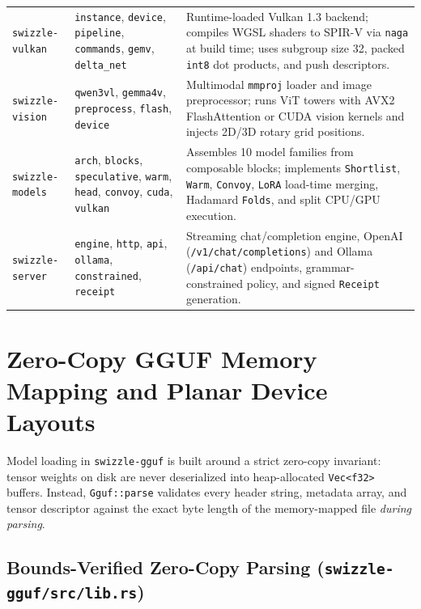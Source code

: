 \documentclass[10pt,a4paper]{article}
\theoremstyle{swzstyle}
\newcommand{\code}[1]{\texttt{#1}}
\begin{document}
\begin{table}[htbp]
\begin{tabularx}{\textwidth}{@{}llX@{}}
    \code{swizzle-vulkan} & \code{instance}, \code{device}, \code{pipeline}, \code{commands}, \code{gemv}, \code{delta\_net} & Runtime-loaded Vulkan 1.3 backend; compiles WGSL shaders to SPIR-V via \code{naga} at build time; uses subgroup size 32, packed \code{int8} dot products, and push descriptors. \\
    \code{swizzle-vision} & \code{qwen3vl}, \code{gemma4v}, \code{preprocess}, \code{flash}, \code{device} & Multimodal \code{mmproj} loader and image preprocessor; runs ViT towers with AVX2 FlashAttention or CUDA vision kernels and injects 2D/3D rotary grid positions. \\
    \code{swizzle-models} & \code{arch}, \code{blocks}, \code{speculative}, \code{warm}, \code{head}, \code{convoy}, \code{cuda}, \code{vulkan} & Assembles 10 model families from composable blocks; implements \code{Shortlist}, \code{Warm}, \code{Convoy}, \code{LoRA} load-time merging, Hadamard \code{Folds}, and split CPU/GPU execution. \\
    \code{swizzle-server} & \code{engine}, \code{http}, \code{api}, \code{ollama}, \code{constrained}, \code{receipt} & Streaming chat/completion engine, OpenAI (\code{/v1/chat/completions}) and Ollama (\code{/api/chat}) endpoints, grammar-constrained policy, and signed \code{Receipt} generation. \\
    \bottomrule
  \end{tabularx}
\end{table}

\section{Zero-Copy GGUF Memory Mapping and Planar Device Layouts}

Model loading in \code{swizzle-gguf} is built around a strict zero-copy invariant: tensor weights on disk are never deserialized into heap-allocated \code{Vec<f32>} buffers. Instead, \code{Gguf::parse} validates every header string, metadata array, and tensor descriptor against the exact byte length of the memory-mapped file \emph{during parsing}.

\subsection{Bounds-Verified Zero-Copy Parsing (\texttt{swizzle-gguf/src/lib.rs})}
\end{document}
